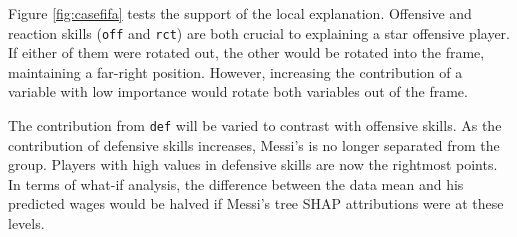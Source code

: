 \documentclass[
]{jss}
\begin{document}
Figure \ref{fig:casefifa} tests the support of the local explanation.
Offensive and reaction skills (\texttt{off} and \texttt{rct}) are both
crucial to explaining a star offensive player. If either of them were
rotated out, the other would be rotated into the frame, maintaining a
far-right position. However, increasing the contribution of a variable
with low importance would rotate both variables out of the frame.

The contribution from \texttt{def} will be varied to contrast with
offensive skills. As the contribution of defensive skills increases,
Messi's is no longer separated from the group. Players with high values
in defensive skills are now the rightmost points. In terms of what-if
analysis, the difference between the data mean and his predicted wages
would be halved if Messi's tree SHAP attributions were at these levels.
\end{document}
